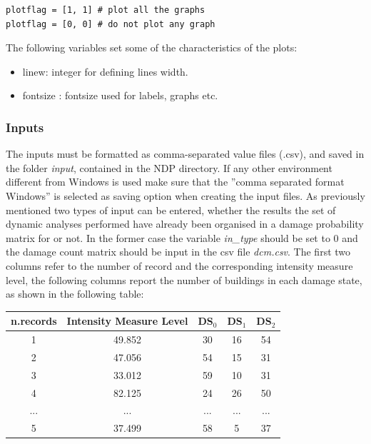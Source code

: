 \begin{Verbatim}[frame=single, commandchars=\\\{\}, samepage=true]
plotflag = [1, 1] # plot all the graphs
plotflag = [0, 0] # do not plot any graph
\end{Verbatim}

The following variables set some of the characteristics of the plots:
\begin{itemize}
\item linew: integer for defining lines width.
\item fontsize : fontsize used for labels, graphs etc.
\end{itemize}

\subsubsection{Inputs}
The inputs must be formatted as comma-separated value files (.csv), and saved in the folder \textit{input}, contained in the NDP directory. If any other environment different from Windows is used make sure that the ”comma separated format Windows” is selected as saving option when creating the input files. As previously mentioned two types of input can be entered, whether the results the set of dynamic analyses performed have already been organised in a damage probability matrix for or not. In the former case the variable \textit{in\_type} should be set to 0 and the damage count matrix should be input in the csv file \textit{dcm.csv}. The first two columns refer to the number of record and the corresponding intensity measure level, the following columns report the number of buildings in each damage state, as shown in the following table:

\begin{table}[H]
\centering
\begin{tabular}{|c|c|c|c|c|} \hline
\textbf{n.records} & \textbf{Intensity Measure Level} & \textbf{DS$_0$} & \textbf{DS$_1$} & \textbf{DS$_2$} \\ \hline
1 & 49.852 &	30 &	16 &	54\\ \hline
2 & 47.056 &	54 &	15 &	31\\ \hline
3 & 33.012 &	59 &	10 &	31\\ \hline
4 & 82.125 &	24 &	26 &	50\\ \hline
... & ... & ... & ... & ... \\ \hline
5 & 37.499 &	58 &	5 &	37\\ \hline
\end{tabular}
\end{table}

